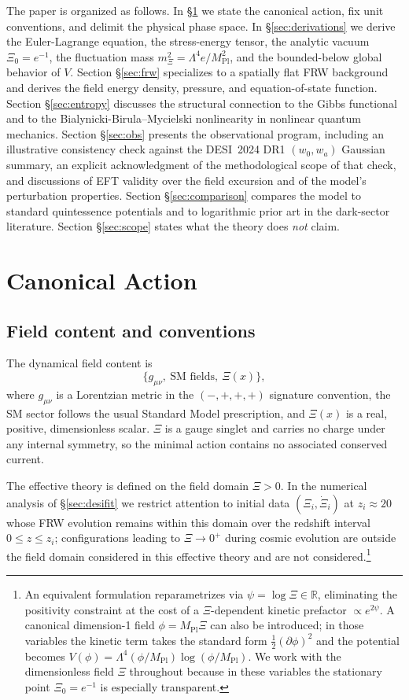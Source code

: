 \documentclass[11pt,reqno]{amsart}
\theoremstyle{plain}
\theoremstyle{definition}
\theoremstyle{remark}
\newcommand{\Pl}{\mathrm{Pl}}
\begin{document}
The paper is organized as follows. In \S\ref{sec:action} we state the
canonical action, fix unit conventions, and delimit the physical phase space.
In \S\ref{sec:derivations} we derive the Euler-Lagrange equation, the
stress-energy tensor, the analytic vacuum $\Xi_0 = e^{-1}$, the fluctuation
mass $m_\Xi^{2} = \Lambda^{4} e / M_\Pl^{2}$, and the bounded-below
global behavior of $V$.
Section \S\ref{sec:frw} specializes to a spatially flat FRW background and
derives the field energy density, pressure, and equation-of-state function.
Section \S\ref{sec:entropy} discusses the structural connection to the
Gibbs functional and to the Bialynicki-Birula--Mycielski nonlinearity in
nonlinear quantum mechanics. Section \S\ref{sec:obs} presents the
observational program, including an illustrative consistency check against
the DESI~2024 DR1 $(w_0, w_a)$ Gaussian summary, an explicit acknowledgment
of the methodological scope of that check, and discussions of EFT validity
over the field excursion and of the model's perturbation properties.
Section \S\ref{sec:comparison} compares the model to standard quintessence
potentials and to logarithmic prior art in the dark-sector literature.
Section \S\ref{sec:scope} states what the theory does \emph{not} claim.

\section{Canonical Action}\label{sec:action}

\subsection{Field content and conventions}\label{sec:fieldcontent}

The dynamical field content is
\[
  \bigl\{ g_{\mu\nu},\ \text{SM fields},\ \Xi(x) \bigr\},
\]
where $g_{\mu\nu}$ is a Lorentzian metric in the $(-,+,+,+)$ signature
convention, the SM sector follows the usual Standard Model prescription,
and $\Xi(x)$ is a real, positive, dimensionless scalar. $\Xi$ is a gauge
singlet and carries no charge under any internal symmetry, so the
minimal action contains no associated conserved current.

The effective theory is defined on the field domain $\Xi > 0$. In the
numerical analysis of \S\ref{sec:desifit} we restrict attention to initial
data $(\Xi_i, \dot\Xi_i)$ at $z_i \approx 20$ whose FRW evolution remains
within this domain over the redshift interval $0 \leq z \leq z_i$;
configurations leading to $\Xi \to 0^{+}$ during cosmic evolution are
outside the field domain considered in this effective theory and are
not considered.\footnote{An
equivalent formulation reparametrizes via $\psi = \log\Xi \in \mathbb{R}$,
eliminating the positivity constraint at the cost of a $\Xi$-dependent
kinetic prefactor $\propto e^{2\psi}$. A canonical dimension-1 field
$\phi = M_\Pl \Xi$ can also be introduced; in those variables the kinetic
term takes the standard form $\tfrac{1}{2}(\partial\phi)^{2}$ and the
potential becomes $V(\phi) = \Lambda^{4}(\phi/M_\Pl) \log(\phi/M_\Pl)$.
We work with the dimensionless field $\Xi$ throughout because in these
variables the stationary point $\Xi_0 = e^{-1}$ is especially transparent.}
\end{document}
